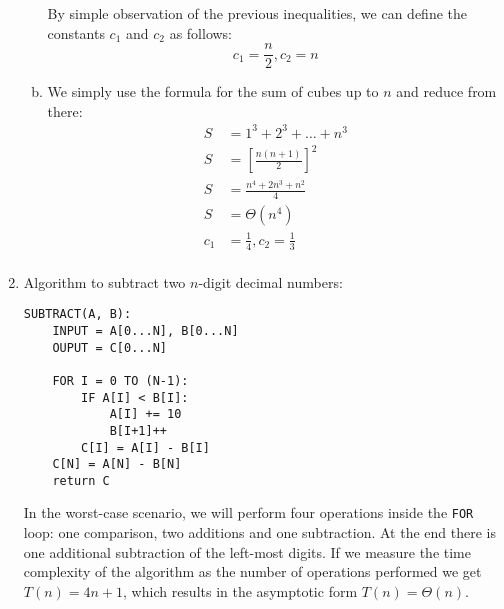 \documentclass{article}
\begin{document}
\begin{enumerate}[1.]
\begin{enumerate}[(a)]
        By simple observation of the previous inequalities, we can define the constants $c_1$ and $c_2$ as follows:
        \begin{equation*}
            c_1 = \frac{n}{2}, c_2 = n
        \end{equation*}
        \item We simply use the formula for the sum of cubes up to $n$ and reduce from there:
        \begin{align*}
            S &= 1^3 + 2^3 + \ldots + n^3\\
            S &= \left[\frac{n(n+1)}{2}\right]^2\\
            S &= \frac{n^4 + 2 n^3 + n^2}{4}\\
            S &= \Theta(n^4)\\
            c_1 &= \frac{1}{4}, c_2 = \frac{1}{3}\\
        \end{align*}
    \end{enumerate}
	    
    \item Algorithm to subtract two $n$-digit decimal numbers:\\
        \begin{Verbatim}[obeytabs]
SUBTRACT(A, B):
    INPUT = A[0...N], B[0...N]
    OUPUT = C[0...N]
    
    FOR I = 0 TO (N-1):
        IF A[I] < B[I]:
            A[I] += 10
            B[I+1]++
        C[I] = A[I] - B[I]
    C[N] = A[N] - B[N]
    return C
        \end{Verbatim}

In the worst-case scenario, we will perform four operations inside the \texttt{FOR} loop: one comparison, two additions and one subtraction. At the end there is one additional subtraction of the left-most digits. If we measure the time complexity of the algorithm as the number of operations performed we get $T(n) = 4n + 1$, which results in the asymptotic form $T(n) = \Theta(n)$.

\end{enumerate}
\end{document}
